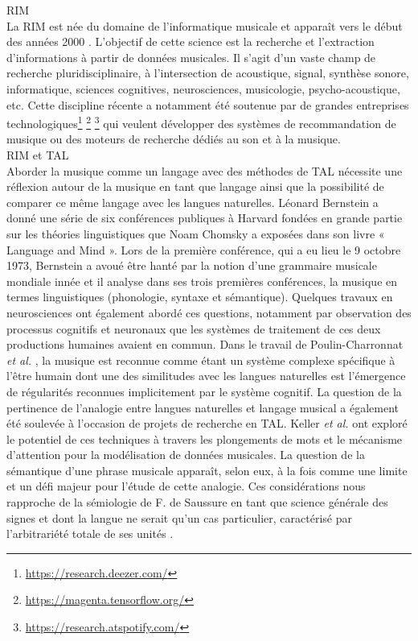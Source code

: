 RIM\\
La RIM est née du domaine de l’informatique musicale et apparaît vers le début
des années 2000 \cite{MIR_1}. L’objectif de cette science est la recherche et
l’extraction d’informations à partir de données musicales. Il s’agit d’un vaste
champ de recherche pluridisciplinaire, à l’intersection de acoustique, signal,
synthèse sonore, informatique, sciences cognitives, neurosciences, musicologie,
psycho-acoustique, etc. Cette discipline récente a notamment été soutenue par
de grandes entreprises technologiques\footnote{\url{
https://research.deezer.com/}} \footnote{\url{https://magenta.tensorflow.org/}}
\footnote{\url{https://research.atspotify.com/}} qui veulent développer des
systèmes de recommandation de musique ou des moteurs de recherche dédiés au son
et à la musique.\\

RIM et TAL \\
Aborder la musique comme un langage avec des méthodes de TAL nécessite une
réflexion autour de la musique en tant que langage ainsi que la possibilité de
comparer ce même langage avec les langues naturelles. Léonard Bernstein
\cite{lbernstein} a donné une série de six conférences publiques à Harvard
fondées en grande partie sur les théories linguistiques que Noam Chomsky a
exposées dans son livre « Language and Mind ». Lors de la première conférence,
qui a eu lieu le 9 octobre 1973, Bernstein a avoué être hanté par la notion
d’une grammaire musicale mondiale innée et il analyse dans ses trois premières
conférences, la musique en termes linguistiques (phonologie, syntaxe et
sémantique). Quelques travaux en neurosciences ont
également abordé ces questions, notamment par observation des processus
cognitifs et neuronaux que les systèmes de traitement de ces deux productions
humaines avaient en commun. Dans le travail de Poulin-Charronnat
\textit{et al.} \cite{poulincharronnat:hal-01985213}, la musique est reconnue
comme étant un système complexe spécifique à l’être humain dont une des
similitudes avec les langues naturelles est l’émergence de régularités
reconnues implicitement par le système cognitif. La question de la pertinence
de l’analogie entre langues naturelles et langage musical a également été
soulevée à l’occasion de projets de recherche en TAL. Keller \textit{et al.}
\cite{keller:hal-03279850} ont exploré le potentiel de ces techniques à travers
les plongements de mots et le mécanisme d’attention pour la modélisation de
données musicales. La question de la sémantique d’une phrase musicale apparaît,
selon eux, à la fois comme une limite et un défi majeur pour l’étude de cette
analogie. Ces considérations nous rapproche de la sémiologie de F. de Saussure
en tant que science générale des signes et dont la langue ne serait qu’un cas
particulier, caractérisé par l’arbitrariété totale de ses unités
\cite{wunderli2017ferdinand}.

